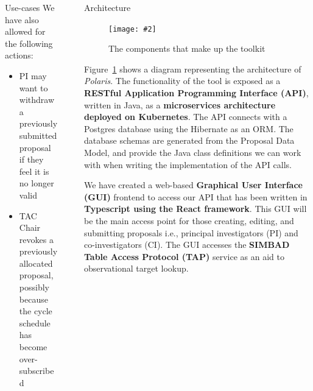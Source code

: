 \documentclass[final]{beamer}
\newlength{\sepwidth}
\newlength{\colwidth}
\newcommand{\separatorcolumn}{\begin{column}{\sepwidth}\end{column}}
\newcommand{\insertFigure}[3][width=1.0\textwidth]{%
    \begin{figure}[ht]
    \centering
    \texttt{[image: \#2]}
    \caption{#3}
    \label{fig:#2}
    \end{figure}
}
\begin{document}
\begin{frame}[t]
\begin{columns}[t]
\begin{column}{\colwidth}
\begin{block}{Use-cases}
                    We have also allowed for the following actions:

                    \begin{itemize}
                        \item PI may want to withdraw a previously submitted proposal if they feel it is no longer valid
                        \item TAC Chair revokes a previously allocated proposal, possibly because the cycle schedule has become over-subscribed
                    \end{itemize}

                \end{block}

            \end{column}

            \separatorcolumn

            \begin{column}{\colwidth}

                \begin{block}{Architecture}

                    \insertFigure[width=30cm,height=35cm]{architecture}{The components that make up the toolkit}

                    Figure~\ref{fig:architecture} shows a diagram representing the architecture of \emph{Polaris}.
                    The functionality of the tool is exposed as a \textbf{RESTful Application Programming Interface (API)},
                    written in Java, as a \textbf{microservices architecture deployed on Kubernetes}.
                    The API connects with a Postgres database using the Hibernate as an ORM.
                    The database schemas are generated from the Proposal Data Model, and provide the Java class
                    definitions we can work with when writing the implementation of the API calls.

                    We have created a web-based \textbf{Graphical User Interface (GUI)} frontend to access our API
                    that has been written in \textbf{Typescript using the React framework}.
                    This GUI will be the main access point for those creating, editing, and submitting proposals i.e.,
                    principal investigators (PI) and co-investigators (CI).
                    The GUI accesses the \textbf{SIMBAD Table Access Protocol (TAP)} service as an aid to observational
                    target lookup.


\end{block}
\end{column}
\end{columns}
\end{frame}
\end{document}

